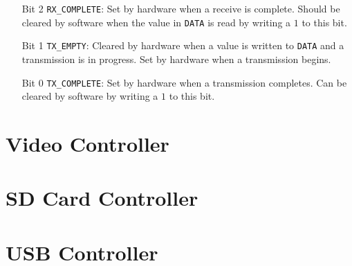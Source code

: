 \documentclass[11pt,openany]{report}
\begin{document}
\begin{enumerate}
\item[Bit 2] \verb|RX_COMPLETE|: Set by hardware when a receive is
  complete. Should be cleared by software when the value in
  \verb|DATA| is read by writing a $1$ to this bit.
\item[Bit 1] \verb|TX_EMPTY|: Cleared by hardware when a value is
  written to \verb|DATA| and a transmission is in progress. Set by
  hardware when a transmission begins.
\item[Bit 0] \verb|TX_COMPLETE|: Set by hardware when a transmission
  completes. Can be cleared by software by writing a $1$ to this bit.
\end{enumerate}


\section{Video Controller}

\section{SD Card Controller}

\section{USB Controller}
\end{document}
